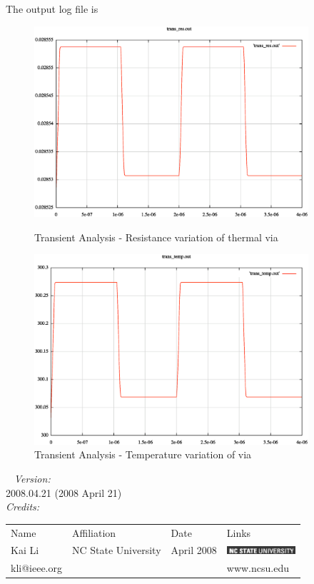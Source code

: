 \documentclass{article}
\begin{document}
The output log file is

\begin{figure}[h]
\centerline{\includegraphics[width=4in]{trans_res.eps}}\caption{Transient Analysis - Resistance variation of thermal via}
\centerline{\includegraphics[width=4in]{trans_temp.eps}}\caption{Transient Analysis - Temperature variation of via}
\end{figure}
\clearpage
~
\myThickLine
\textit{Version:}\\
2008.04.21 (2008 April 21) \\
\myThickLine
\medskip
\textit{Credits:}\\
\begin{tabular}{l  l  l  l}
Name & Affiliation & Date & Links \\
Kai Li & NC State University & April 2008 & \includegraphics[width=1in]{logo.eps}  \\
kli@ieee.org & & & www.ncsu.edu    \\
\end{tabular}
\end{document}
